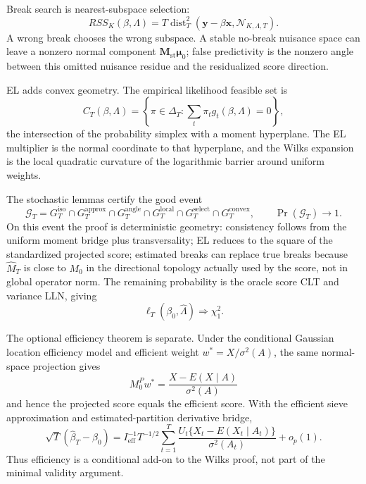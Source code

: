 \documentclass[12pt]{article}
\numberwithin{equation}{section}
\theoremstyle{definition}
\newcommand{\N}{\mathcal N}
\begin{document}
Break search is nearest-subspace selection:
\[
    RSS_K(\beta,\Lambda)
    =T\operatorname{dist}_T^2(\bm y-\beta\bm x,
      \N_{K,\Lambda,T}).
\]
A wrong break chooses the wrong subspace. A stable no-break nuisance space can
leave a nonzero normal component \(\bm M_{\mathrm{st}}\bm\mu_0\); false
predictivity is the nonzero angle between this omitted nuisance residue and the
residualized score direction.

EL adds convex geometry. The empirical likelihood feasible set is
\[
    C_T(\beta,\Lambda)=
    \left\{\pi\in\Delta_T:\sum_t\pi_tg_t(\beta,\Lambda)=0\right\},
\]
the intersection of the probability simplex with a moment hyperplane. The EL
multiplier is the normal coordinate to that hyperplane, and the Wilks expansion
is the local quadratic curvature of the logarithmic barrier around uniform
weights.

The stochastic lemmas certify the good event
\[
    \mathcal G_T
    =G_T^{\mathrm{iso}}
     \cap G_T^{\mathrm{approx}}
     \cap G_T^{\mathrm{angle}}
     \cap G_T^{\mathrm{local}}
     \cap G_T^{\mathrm{select}}
     \cap G_T^{\mathrm{convex}},
    \qquad \Pr(\mathcal G_T)\to1.
\]
On this event the proof is deterministic geometry: consistency follows from the
uniform moment bridge plus transversality; EL reduces to the square of the
standardized projected score; estimated breaks can replace true breaks because
\(\widehat M_T\) is close to \(M_0\) in the directional topology actually used by
the score, not in global operator norm. The remaining probability is the oracle
score CLT and variance LLN, giving
\[
    \ell_T(\beta_0,\widehat\Lambda)\Rightarrow\chi_1^2.
\]

The optional efficiency theorem is separate. Under the conditional Gaussian
location efficiency model and efficient weight \(w^*=X/\sigma^2(A)\), the same
normal-space projection gives
\[
    M_0^Pw^*=\frac{X-E(X\mid A)}{\sigma^2(A)}
\]
and hence the projected score equals the efficient score. With the efficient
sieve approximation and estimated-partition derivative bridge,
\[
    \sqrt T(\widehat\beta_T-\beta_0)
    =I_{\mathrm{eff}}^{-1}T^{-1/2}\sum_{t=1}^T
      \frac{U_t\{X_t-E(X_t\mid A_t)\}}{\sigma^2(A_t)}+
      o_p(1).
\]
Thus efficiency is a conditional add-on to the Wilks proof, not part of the
minimal validity argument.
\end{document}
